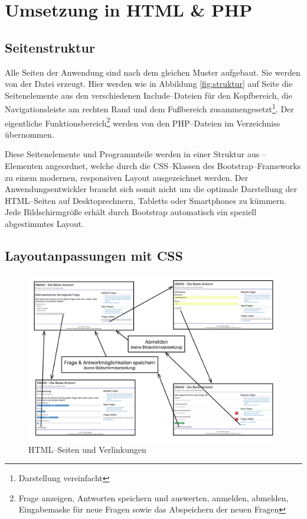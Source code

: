 \section{Umsetzung in HTML \& PHP}

\subsection{Seitenstruktur}

Alle Seiten der Anwendung sind nach dem gleichen Muster aufgebaut. Sie werden von der Datei  erzeugt. Hier werden wie in Abbildung \ref{fig:struktur} auf Seite \pageref{fig:struktur} die Seitenelemente aus den verschiedenen Include--Dateien für den Kopfbereich, die Navigationsleiste am rechten Rand und dem Fußbereich zusammengesetzt\footnote{Darstellung vereinfacht}. Der eigentliche Funktionsbereich\footnote{Frage anzeigen, Antworten speichern und auswerten, anmelden, abmelden, Eingabemaske für neue Fragen sowie das Abspeichern der neuen Fragen} werden von den PHP--Dateien im Verzeichniss  übernommen.

Diese Seitenelemente und Programmteile werden in einer Struktur aus --Elementen angeordnet, welche durch die CSS--Klassen des Bootstrap--Frameworks zu einem modernen, responsiven Layout ausgezeichnet werden. Der Anwendungsentwickler braucht sich somit nicht um die optimale Darstellung der HTML--Seiten auf Desktoprechnern, Tabletts oder Smartphones zu kümmern. Jede Bildschirmgröße erhält durch Bootstrap automatisch ein speziell abgestimmtes Layout.



\subsection{Layoutanpassungen mit CSS}




\begin{figure}[h]
\begin{center}
\includegraphics[width=\textwidth]{zustaende.jpg}
\caption{HTML--Seiten und Verlinkungen}
\end{center}
\label{fig:zustaende}
\end{figure}

